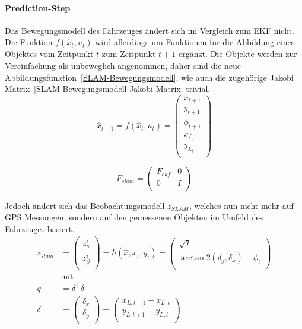 \documentclass[11pt]{article}
\begin{document}
\paragraph{Prediction-Step}
Das Bewegungsmodell des Fahrzeuges ändert sich im Vergleich zum EKF nicht. Die Funktion $f(\hat{x}_t, u_t)$ wird allerdings um Funktionen für die Abbildung eines Objektes vom Zeitpunkt $t$ zum Zeitpunkt $t+1$ ergänzt. Die Objekte werden zur Vereinfachung als unbeweglich angenommen, daher sind die neue Abbildungsfunktion~\ref{SLAM-Bewegungsmodell}, wie auch die zugehörige Jakobi Matrix~\ref{SLAM-Bewegungsmodell-Jakobi-Matrix} trivial.
\begin{equation}\label{SLAM-Bewegungsmodell}
	\hat{x}_{t+1}^- = f(\hat{x}_{t},u_t) = \begin{pmatrix}
		x_{t+1} \\
		y_{t+1} \\
		\phi_{t+1} \\
		x_{L_t} \\
		y_{L_t} \\
	\end{pmatrix}
\end{equation}

\begin{equation}\label{SLAM-Bewegungsmodell-Jakobi-Matrix}
	F_{slam} = \begin{pmatrix}
		F_{ekf} & 0 \\
		0 & I \\
	\end{pmatrix}
\end{equation}

Jedoch ändert sich das Beobachtungsmodell $z_{SLAM}$, welches nun nicht mehr auf GPS Messungen, sondern auf den gemessenen Objekten im Umfeld des Fahrzeuges basiert.
\begin{equation}\label{SLAM-Observation-Model}
\begin{split}
	z_{slam} &= \begin{pmatrix}
		z_\gamma^i \\
		z_\beta^i \\
	\end{pmatrix} = h(\hat{x}, x_i, y_i) = \begin{pmatrix}
		\sqrt{q} \\
		\arctan 2(\delta_y, \delta_x) - \phi_t \\
	\end{pmatrix}\\
	&\text{mit} \\
	q &= \delta^\intercal \delta \\
	\delta &= \begin{pmatrix}
		\delta_x \\
		\delta_y \\
	\end{pmatrix} = \begin{pmatrix}
		x_{L, t+1} - x_{L, t}  \\
		y_{L, t+1}  - y_{L, t} \\
	\end{pmatrix}
\end{split}
\end{equation}
\end{document}
